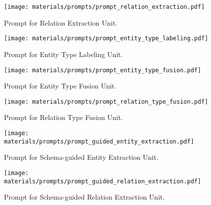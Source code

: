 \begin{figure}[h]
    \centering
    \texttt{[image: materials/prompts/prompt\_relation\_extraction.pdf]}
    \caption{Prompt for Relation Extraction Unit.}
    \label{fig: re}
\end{figure}

\begin{figure}[h]
    \centering
    \texttt{[image: materials/prompts/prompt\_entity\_type\_labeling.pdf]}
    \caption{Prompt for Entity Type Labeling Unit.}
    \label{fig: etl}
\end{figure}

\clearpage

\begin{figure}[htbp]
    \centering
    \texttt{[image: materials/prompts/prompt\_entity\_type\_fusion.pdf]}
    \caption{Prompt for Entity Type Fusion Unit.}
    \label{fig: etf}
\end{figure}

\begin{figure}[htbp]
    \centering
    \texttt{[image: materials/prompts/prompt\_relation\_type\_fusion.pdf]}
    \caption{Prompt for Relation Type Fusion Unit.}
    \label{fig: rtf}
\end{figure}

\begin{figure}[H]
    \centering
    \texttt{[image: materials/prompts/prompt\_guided\_entity\_extraction.pdf]}
    \caption{Prompt for Schema-guided Entity Extraction Unit.}
    \label{fig: see}
\end{figure}

\begin{figure}[H]
    \centering
    \texttt{[image: materials/prompts/prompt\_guided\_relation\_extraction.pdf]}
    \caption{Prompt for Schema-guided Relation Extraction Unit.}
    \label{fig: sre}
\end{figure}

\clearpage
